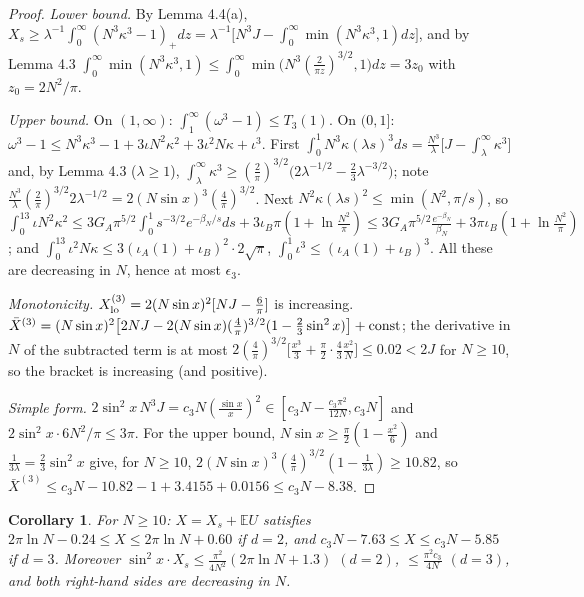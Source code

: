 \documentclass[11pt,a4paper]{article}
\newtheorem{corollary}[theorem]{Corollary}
\theoremstyle{definition}
\theoremstyle{remark}
\begin{document}
\begin{proof}
\emph{Lower bound.} By Lemma 4.4(a), $X_s\ge\lambda^{-1}\int_0^\infty(N^3\kappa^3-1)_+dz=\lambda^{-1}\bigl[N^3J-\int_0^\infty\min(N^3\kappa^3,1)dz\bigr]$, and by Lemma 4.3 $\int_0^\infty\min(N^3\kappa^3,1)\le\int_0^\infty\min\bigl(N^3(\tfrac{2}{\pi z})^{3/2},1\bigr)dz=3z_0$ with $z_0=2N^2/\pi$.

\emph{Upper bound.} On $(1,\infty)$: $\int_1^\infty(\omega^3-1)\le T_3(1)$. On $(0,1]$: $\omega^3-1\le N^3\kappa^3-1+3\iota N^2\kappa^2+3\iota^2N\kappa+\iota^3$. First $\int_0^1N^3\kappa(\lambda s)^3ds=\frac{N^3}{\lambda}\bigl[J-\int_\lambda^\infty\kappa^3\bigr]$ and, by Lemma 4.3 ($\lambda\ge1$), $\int_\lambda^\infty\kappa^3\ge(\frac2\pi)^{3/2}\bigl(2\lambda^{-1/2}-\frac23\lambda^{-3/2}\bigr)$; note $\frac{N^3}{\lambda}(\frac2\pi)^{3/2}2\lambda^{-1/2}=2(N\sin x)^3(\frac4\pi)^{3/2}$. Next $N^2\kappa(\lambda s)^2\le\min(N^2,\pi/s)$, so $\int_0^13\iota N^2\kappa^2\le3G_A\pi^{5/2}\int_0^1s^{-3/2}e^{-\beta_N/s}ds+3\iota_B\pi(1+\ln\frac{N^2}\pi)\le3G_A\pi^{5/2}\frac{e^{-\beta_N}}{\beta_N}+3\pi\iota_B(1+\ln\frac{N^2}{\pi})$; and $\int_0^13\iota^2N\kappa\le3(\iota_A(1)+\iota_B)^2\cdot2\sqrt\pi$, $\int_0^1\iota^3\le(\iota_A(1)+\iota_B)^3$. All these are decreasing in $N$, hence at most $\epsilon_3$.

\emph{Monotonicity.} $X^{(3)}_{\rm lo}=2(N\sin x)^2[NJ-\frac6\pi]$ is increasing. $\bar X^{(3)}=(N\sin x)^2\bigl[2NJ-2(N\sin x)(\frac4\pi)^{3/2}(1-\frac23\sin^2x)\bigr]+{\rm const}$; the derivative in $N$ of the subtracted term is at most $2(\frac4\pi)^{3/2}\bigl[\frac{x^3}{3}+\frac\pi2\cdot\frac43\frac{x^2}{N}\bigr]\le0.02<2J$ for $N\ge10$, so the bracket is increasing (and positive).

\emph{Simple form.} $2\sin^2x\,N^3J=c_3N(\frac{\sin x}x)^2\in[c_3N-\frac{c_3\pi^2}{12N},c_3N]$ and $2\sin^2x\cdot6N^2/\pi\le3\pi$. For the upper bound, $N\sin x\ge\frac\pi2(1-\frac{x^2}{6})$ and $\frac1{3\lambda}=\frac23\sin^2x$ give, for $N\ge10$, $2(N\sin x)^3(\frac4\pi)^{3/2}(1-\frac1{3\lambda})\ge10.82$, so $\bar X^{(3)}\le c_3N-10.82-1+3.4155+0.0156\le c_3N-8.38$.
\end{proof}

\begin{corollary}
For $N\ge10$: $X=X_s+\mathbb EU$ satisfies $2\pi\ln N-0.24\le X\le2\pi\ln N+0.60$ if $d=2$, and $c_3N-7.63\le X\le c_3N-5.85$ if $d=3$. Moreover $\sin^2x\cdot X_s\le\frac{\pi^2}{4N^2}(2\pi\ln N+1.3)$ $(d=2)$, $\le\frac{\pi^2c_3}{4N}$ $(d=3)$, and both right-hand sides are decreasing in $N$.
\end{corollary}
\end{document}
